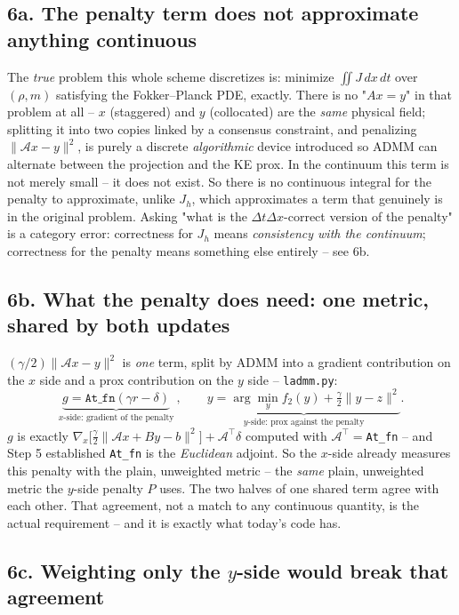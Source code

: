 \documentclass[11pt]{article}
\newcommand{\dt}{\Delta t}
\newcommand{\dx}{\Delta x}
\newcommand{\code}[1]{\texttt{#1}}
\begin{document}
\subsection*{6a. The penalty term does not approximate anything continuous}

The \emph{true} problem this whole scheme discretizes is: minimize $\iint J\,dx\,dt$ over
$(\rho,m)$ satisfying the Fokker--Planck PDE, exactly. There is no "$Ax=y$" in that problem at
all -- $x$ (staggered) and $y$ (collocated) are the \emph{same} physical field; splitting it into
two copies linked by a consensus constraint, and penalizing $\|\mathcal{A}x-y\|^2$, is purely a
discrete \emph{algorithmic} device introduced so ADMM can alternate between the projection and the
KE prox. In the continuum this term is not merely small -- it does not exist. So there is no
continuous integral for the penalty to approximate, unlike $J_h$, which approximates a term that
genuinely is in the original problem. Asking "what is the $\dt\dx$-correct version of the penalty"
is a category error: correctness for $J_h$ means \emph{consistency with the continuum}; correctness
for the penalty means something else entirely -- see 6b.

\subsection*{6b. What the penalty does need: one metric, shared by both updates}

$(\gamma/2)\|\mathcal{A}x-y\|^2$ is \emph{one} term, split by ADMM into a gradient contribution on
the $x$ side and a prox contribution on the $y$ side -- \code{ladmm.py}:
\[
  \underbrace{g = \mathtt{At\_fn}(\gamma r - \delta)}_{x\text{-side: gradient of the penalty}}
  \ , \qquad
  \underbrace{y=\arg\min_y f_2(y)+\tfrac{\gamma}{2}\|y-z\|^2}_{y\text{-side: prox against the penalty}}.
\]
$g$ is exactly $\nabla_x\bigl[\tfrac{\gamma}{2}\|\mathcal{A}x+By-b\|^2\bigr]+\mathcal{A}^\top\delta$
computed with $\mathcal{A}^\top=$\code{At\_fn} -- and Step 5 established \code{At\_fn} is the
\emph{Euclidean} adjoint. So the $x$-side already measures this penalty with the plain,
unweighted metric -- the \emph{same} plain, unweighted metric the $y$-side penalty $P$ uses. The
two halves of one shared term agree with each other. That agreement, not a match to any continuous
quantity, is the actual requirement -- and it is exactly what today's code has.

\subsection*{6c. Weighting only the $y$-side would break that agreement}
\end{document}
